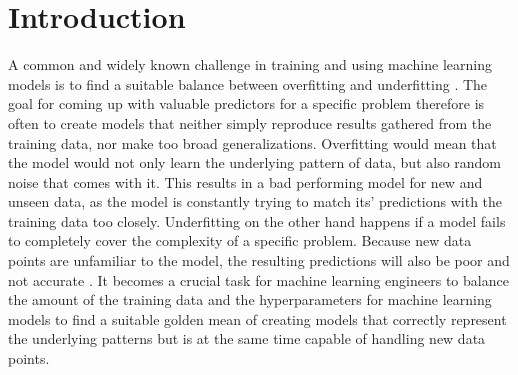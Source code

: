 \chapter{Introduction} 


A common and widely known challenge in training and using machine learning models is to find a suitable balance between overfitting and underfitting \cite{vanderaalst2010}. The goal for coming up with valuable predictors for a specific problem therefore is often to create models that neither simply reproduce results gathered from the training data, nor make too broad generalizations. Overfitting would mean that the model would not only learn the underlying pattern of data, but also random noise that comes with it. This results in a bad performing model for new and unseen data, as the model is constantly trying to match its’ predictions with the training data too closely. Underfitting on the other hand happens if a model fails to completely cover the complexity of a specific problem. Because new data points are unfamiliar to the model, the resulting predictions will also be poor and not accurate \cite{montesinoslopez2022}.  It becomes a crucial task for machine learning engineers to balance the amount of the training data and the hyperparameters for machine learning models to find a suitable golden mean of creating models that correctly represent the underlying patterns but is at the same time capable of handling new data points. 

